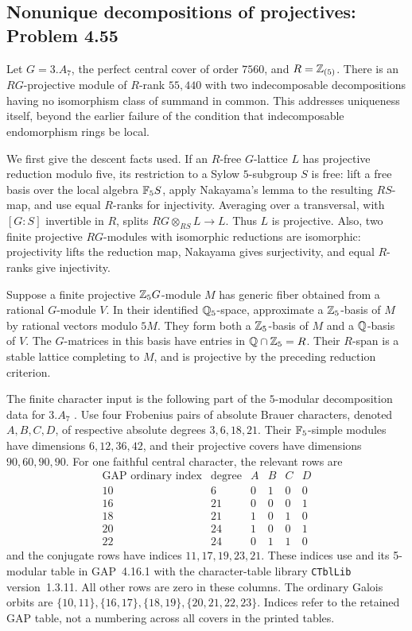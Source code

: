 \subsection{Nonunique decompositions of projectives: Problem 4.55}
\label{cand:4.55}

Let \(G=3.A_7\), the perfect central cover of order \(7560\),
and \(R=\mathbb Z_{(5)}\). There is an \(RG\)-projective module of
\(R\)-rank \(55{,}440\) with two indecomposable decompositions
having no isomorphism class of summand in common. This addresses
uniqueness itself, beyond the earlier failure of the condition
that indecomposable endomorphism rings be local.

We first give the descent facts used. If an \(R\)-free
\(G\)-lattice \(L\) has projective reduction modulo five,
its restriction to a Sylow \(5\)-subgroup \(S\) is free:
lift a free basis over the local algebra \(\mathbb F_5S\),
apply Nakayama's lemma to the resulting \(RS\)-map, and
use equal \(R\)-ranks for injectivity. Averaging over a
transversal, with \([G:S]\) invertible in \(R\), splits
\(RG\otimes_{RS}L\to L\). Thus \(L\) is projective.
Also, two finite projective \(RG\)-modules with isomorphic
reductions are isomorphic: projectivity lifts the reduction
map, Nakayama gives surjectivity, and equal \(R\)-ranks
give injectivity.

Suppose a finite projective \(\mathbb Z_5G\)-module \(M\) has
generic fiber obtained from a rational \(G\)-module \(V\).
In their identified \(\mathbb Q_5\)-space, approximate a
\(\mathbb Z_5\)-basis of \(M\) by rational vectors modulo \(5M\).
They form both a \(\mathbb Z_5\)-basis of \(M\) and a
\(\mathbb Q\)-basis of \(V\). The \(G\)-matrices in this basis
have entries in \(\mathbb Q\cap\mathbb Z_5=R\). Their \(R\)-span
is a stable lattice completing to \(M\), and is
projective by the preceding reduction criterion.

The finite character input is the following part of the
\(5\)-modular decomposition data for \(3.A_7\)
\cite{a7-decomposition,ctbl-3a7}. Use four Frobenius pairs
of absolute Brauer characters, denoted \(A,B,C,D\),
of respective absolute degrees \(3,6,18,21\).
Their \(\mathbb F_5\)-simple modules have dimensions
\(6,12,36,42\), and their projective covers have
dimensions \(90,60,90,90\). For one faithful central
character, the relevant rows are
\[
\begin{array}{c|r|rrrr}
 \text{GAP ordinary index}&\text{degree}&A&B&C&D\\ \hline
 10&6 &0&1&0&0\\
 16&21&0&0&0&1\\
 18&21&1&0&1&0\\
 20&24&1&0&0&1\\
 22&24&0&1&1&0
\end{array}
\]
and the conjugate rows have indices \(11,17,19,23,21\).
These indices use  and its 5-modular
table in GAP~4.16.1 with the character-table library \texttt{CTblLib}
version~1.3.11. All other rows are zero in these columns.
The ordinary Galois orbits are
\(\{10,11\},\{16,17\},\{18,19\},\{20,21,22,23\}\).
Indices refer to the retained GAP table, not a numbering
across all covers in the printed tables.

